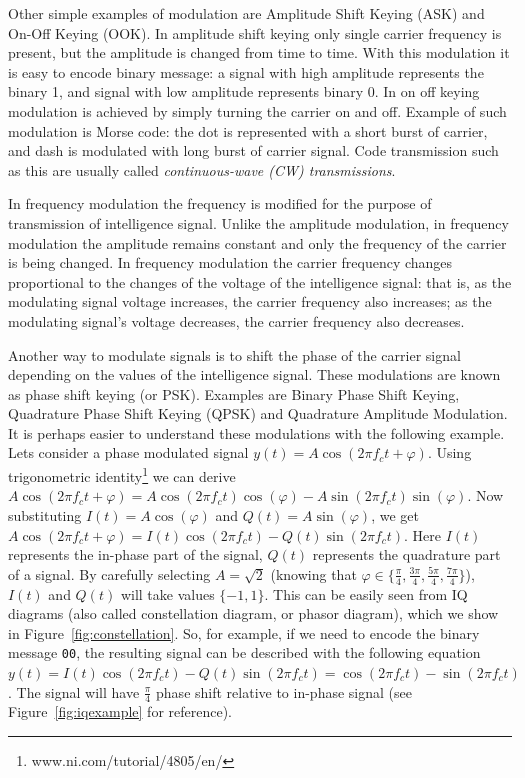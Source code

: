 Other simple examples of modulation are Amplitude Shift Keying (ASK)
and On-Off Keying (OOK). In amplitude shift keying only single 
carrier frequency is present, but the amplitude is changed from time
to time. With this modulation it is easy to encode 
binary message: a signal with high amplitude represents the binary
1, and signal with low amplitude represents binary 0. In on off keying
modulation is achieved by simply turning the carrier on and off. Example
of such modulation is Morse code: the dot is represented with a short
burst of carrier, and dash is modulated with long burst of carrier 
signal. Code transmission such as this are usually called 
\textit{continuous-wave (CW) transmissions}. 

In frequency modulation the frequency is modified for the purpose of transmission
of intelligence signal. Unlike the amplitude modulation, in frequency modulation
the amplitude remains constant and only the frequency of the carrier is being 
changed. In frequency modulation the carrier frequency changes proportional to 
the changes of the voltage of the intelligence signal: that is, as the 
modulating signal voltage increases, the carrier frequency also increases;
as the modulating signal's voltage decreases, the carrier frequency also 
decreases.

Another way to modulate signals is to shift the phase of the carrier signal
depending on the values of the intelligence signal. These modulations are known as 
phase shift keying (or PSK). Examples are Binary Phase Shift Keying, Quadrature Phase
Shift Keying (QPSK) and Quadrature Amplitude Modulation. It is perhaps easier to understand these 
modulations with the following example. Lets consider a phase modulated signal $y(t) = A \cos(2\pi f_c t + \varphi)$. 
Using trigonometric identity\footnote{www.ni.com/tutorial/4805/en/} we can derive 
$A\cos(2\pi f_c t + \varphi) = A\cos(2\pi f_c t) \cos(\varphi) - A \sin(2\pi f_c t)\sin(\varphi)$.
Now substituting $I(t) = A \cos(\varphi)$ and $Q(t) = A \sin(\varphi)$, we 
get $A\cos(2\pi f_c t + \varphi) = I(t) \cos(2\pi f_c t) - Q(t) \sin(2\pi f_c t)$.
Here $I(t)$ represents the in-phase part of the signal, $Q(t)$ represents the quadrature 
part of a signal. By carefully selecting $A=\sqrt{2}$ (knowing that 
$\varphi \in \{\frac{\pi}{4}, \frac{3\pi}{4}, \frac{5\pi}{4}, \frac{7\pi}{4}\}$), 
$I(t)$ and $Q(t)$ will take values $\{-1, 1\}$. This can be easily seen from IQ diagrams 
(also called constellation diagram, or phasor diagram), which we show in 
Figure~\ref{fig:constellation}. So, for example, if we need to encode the binary message \texttt{00},
the resulting signal can be described with the following equation $y(t) = I(t)\cos(2\pi f_c t) - Q(t)\sin(2\pi f_c t) = 
\cos(2\pi f_c t) - \sin(2\pi f_c t)$. The signal will have $\frac{\pi}{4}$ phase shift
relative to in-phase signal (see Figure~\ref{fig:iqexample} for reference).

